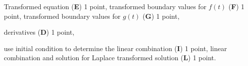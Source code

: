 \begin{bewertung}
\begin{teilaufgaben}
\item
Transformed equation ({\bf E}) 1 point,
transformed boundary values for $f(t)$ ({\bf F}) 1 point,
transformed boundary values for $g(t)$ ({\bf G}) 1 point,
\item
derivatives ({\bf D}) 1 point,
\item
use initial condition to determine the linear combination ({\bf I}) 1 point,
linear combination and solution for Laplace transformed solution ({\bf L})
1 point.
\end{teilaufgaben}
\end{bewertung}


